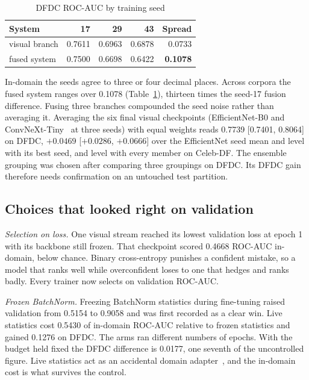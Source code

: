 \documentclass[conference]{IEEEtran}
\begin{document}
\begin{table}[htbp]
\caption{DFDC ROC-AUC by training seed}
\label{tab:seeds}
\centering
\begin{tabular}{lrrrr}
\toprule
System & 17 & 29 & 43 & Spread \\
\midrule
visual branch & 0.7611 & 0.6963 & 0.6878 & 0.0733 \\
fused system & 0.7500 & 0.6698 & 0.6422 & \textbf{0.1078} \\
\bottomrule
\end{tabular}
\end{table}

In-domain the seeds agree to three or four decimal places. Across corpora the
fused system ranges over 0.1078 (Table~\ref{tab:seeds}), thirteen times the
seed-17 fusion difference. Fusing three branches compounded the seed noise
rather than averaging it. Averaging the six final visual checkpoints
(EfficientNet-B0 and ConvNeXt-Tiny~\cite{convnext} at three seeds) with equal
weights reads 0.7739 [0.7401, 0.8064] on DFDC, $+0.0469$ [$+0.0286$, $+0.0666$]
over the EfficientNet seed mean and level with its best seed, and level with
every member on Celeb-DF. The ensemble grouping was chosen after comparing
three groupings on DFDC. Its DFDC gain therefore needs confirmation on an
untouched test partition.

\subsection{Choices that looked right on validation}

\textit{Selection on loss.} One visual stream reached its lowest validation
loss at epoch 1 with its backbone still frozen. That checkpoint scored 0.4668
ROC-AUC in-domain, below chance. Binary cross-entropy punishes a confident
mistake, so a model that ranks well while overconfident loses to one that
hedges and ranks badly. Every trainer now selects on validation ROC-AUC.

\textit{Frozen BatchNorm.} Freezing BatchNorm statistics during fine-tuning
raised validation from 0.5154 to 0.9058 and was first recorded as a clear win.
Live statistics cost 0.5430 of in-domain ROC-AUC relative to frozen statistics
and gained 0.1276 on DFDC. The arms ran different numbers of epochs.
With the budget held
fixed the DFDC difference is 0.0177, one seventh of the uncontrolled figure.
Live statistics act as an accidental domain adapter~\cite{adabn}, and the
in-domain cost is what survives the control.
\end{document}
